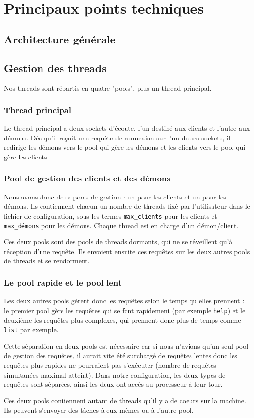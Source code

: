 \chapter{Principaux points techniques}


\section{Architecture générale}




\section{Gestion des threads}
\label{threads_by_pools}
Nos threads sont répartis en quatre "pools", plus un thread principal.

\subsection{Thread principal}
Le thread principal a deux sockets d'écoute, l'un destiné aux clients et
l'autre aux démons. Dès qu'il reçoit une requête de connexion sur l'un de
ses sockets, il redirige les démons vers le pool qui gère les démons et
les clients vers le pool qui gère les clients.

\subsection{Pool de gestion des clients et des démons}
Nous avons donc deux pools de gestion : un pour les clients et un pour
les démons. Ils contiennent chacun un nombre de threads fixé par
l'utilisateur dans le fichier de configuration, sous les termes 
\verb$max_clients$ pour les clients et \verb$max_démons$ pour les démons.
Chaque thread est en charge d'un démon/client.

Ces deux pools sont des pools de threads dormants, qui ne se réveillent qu'à 
réception d'une requête. Ils envoient ensuite ces requêtes sur les deux autres
pools de threads et se rendorment.

\subsection{Le pool rapide et le pool lent}
Les deux autres pools gèrent donc les requêtes selon le temps qu'elles 
prennent : le premier pool gère les requêtes qui se font rapidement 
(par exemple \verb$help$) et le deuxième les requêtes plus complexes, qui 
prennent donc plus de temps comme \verb$list$ par exemple.

Cette séparation en deux pools est nécessaire car si nous n'avions qu'un seul 
pool de gestion des requêtes, il aurait vite été surchargé de requêtes lentes
donc les requêtes plus rapides ne pourraient pas s'exécuter (nombre de requêtes
simultanées maximal atteint). Dans notre configuration, les deux types de 
requêtes sont séparées, ainsi les deux ont accès au processeur à leur tour.

Ces deux pools contiennent autant de threads qu'il y a de coeurs sur la
machine. Ils peuvent s'envoyer des tâches à eux-mêmes ou à l'autre pool.


